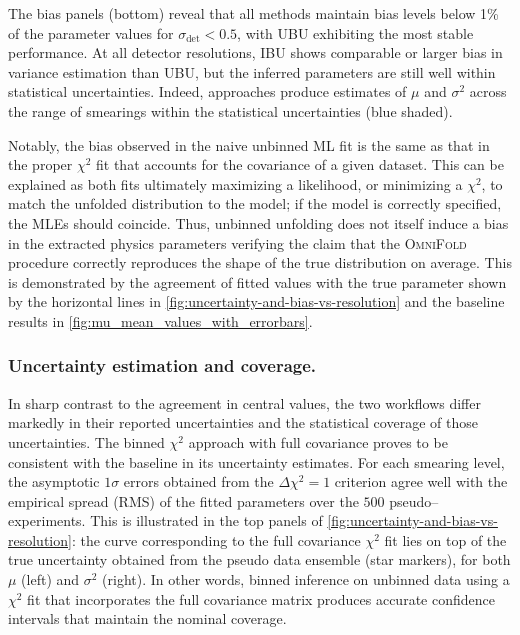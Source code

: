             The bias panels (bottom) reveal that all methods maintain bias levels below 1\% of the parameter values for $\sigma_{\text{det}} < 0.5$, with UBU exhibiting the most stable performance.
            At all detector resolutions, IBU shows comparable or larger bias in variance estimation than UBU, but the inferred parameters are still well within statistical uncertainties.
            Indeed, approaches produce estimates of $\mu$ and $\sigma^2$ across the range of smearings within the statistical uncertainties (blue shaded).
            
            Notably, the bias observed in the naive unbinned ML fit is the same as that in the proper $\chi^2$ fit that accounts for the covariance of a given dataset. 
            This can be explained as both fits ultimately maximizing a likelihood, or minimizing a $\chi^2$, to match the unfolded distribution to the model;
            if the model is correctly specified, the MLEs should coincide.
            Thus, unbinned unfolding does not itself induce a bias in the extracted physics parameters verifying the claim that the \textsc{OmniFold} procedure correctly reproduces the shape of the true distribution on average.
            This is demonstrated by the agreement of fitted values with the true parameter shown by the horizontal lines in \cref{fig:uncertainty-and-bias-vs-resolution} and the baseline results in \cref{fig:mu_mean_values_with_errorbars}. 
            
        \subsubsection{Uncertainty estimation and coverage.}
            In sharp contrast to the agreement in central values, the two workflows differ markedly in their reported uncertainties and the statistical coverage of those uncertainties.
            The binned $\chi^2$ approach with full covariance proves to be consistent with the baseline in its uncertainty estimates.
            For each smearing level, the asymptotic $1\sigma$ errors obtained from the $\Delta\chi^2=1$ criterion agree well with the empirical spread (RMS) of the fitted parameters over the \(\num{500}\) pseudo--experiments.
            This is illustrated in the top panels of \cref{fig:uncertainty-and-bias-vs-resolution}: the curve corresponding to the full covariance $\chi^2$ fit lies on top of the true uncertainty obtained from the pseudo data ensemble (star markers), for both $\mu$ (left) and $\sigma^2$ (right).
            In other words, binned inference on unbinned data using a \(\chi^2\) fit that incorporates the full covariance matrix produces accurate confidence intervals that maintain the nominal coverage.
            
